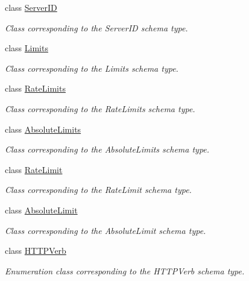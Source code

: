 \begin{DoxyCompactItemize}
class \hyperlink{classopenstack_1_1xml_1_1ServerID}{ServerID}
\begin{DoxyCompactList}\small\item\em Class corresponding to the ServerID schema type. \item\end{DoxyCompactList}\item 
class \hyperlink{classopenstack_1_1xml_1_1Limits}{Limits}
\begin{DoxyCompactList}\small\item\em Class corresponding to the Limits schema type. \item\end{DoxyCompactList}\item 
class \hyperlink{classopenstack_1_1xml_1_1RateLimits}{RateLimits}
\begin{DoxyCompactList}\small\item\em Class corresponding to the RateLimits schema type. \item\end{DoxyCompactList}\item 
class \hyperlink{classopenstack_1_1xml_1_1AbsoluteLimits}{AbsoluteLimits}
\begin{DoxyCompactList}\small\item\em Class corresponding to the AbsoluteLimits schema type. \item\end{DoxyCompactList}\item 
class \hyperlink{classopenstack_1_1xml_1_1RateLimit}{RateLimit}
\begin{DoxyCompactList}\small\item\em Class corresponding to the RateLimit schema type. \item\end{DoxyCompactList}\item 
class \hyperlink{classopenstack_1_1xml_1_1AbsoluteLimit}{AbsoluteLimit}
\begin{DoxyCompactList}\small\item\em Class corresponding to the AbsoluteLimit schema type. \item\end{DoxyCompactList}\item 
class \hyperlink{classopenstack_1_1xml_1_1HTTPVerb}{HTTPVerb}
\begin{DoxyCompactList}\small\item\em Enumeration class corresponding to the HTTPVerb schema type. \item\end{DoxyCompactList}\item 

\end{DoxyCompactItemize}
